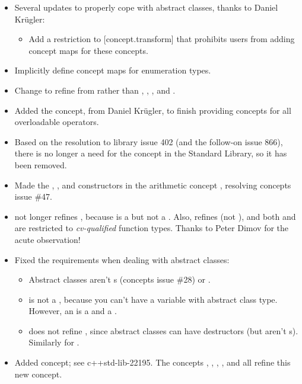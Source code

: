 \documentclass[american,twoside]{book}
\begin{document}
\begin{titlepage}
\begin{itemize}
\item Several updates to properly cope with abstract classes, thanks
  to Daniel Kr\"ugler:
  \begin{itemize}
  \item Add a restriction to [concept.transform] that prohibits users
    from adding concept maps for these concepts.
  \end{itemize}
  \item Implicitly define  concept
    maps for enumeration types.
  \item Change  to refine from
     rather than ,
    , , and
    . 
  \item Added the  
    concept, from Daniel Kr\"ugler, to finish providing concepts for
    all overloadable operators.
  \item Based on the resolution to library issue 402 (and the
    follow-on issue 866), there is no longer a need for the
     concept in the Standard Library, so it has
    been removed.
  \item Made the , , and
     constructors in the arithmetic concept
    , resolving concepts issue \#47.
  \item {} not longer refines
    , because  is a
     but not a . Also,
     refines  (not
    ), and both  and
     are restricted to \emph{cv-qualified}
    function types. Thanks to
    Peter Dimov for the acute observation!
  \item Fixed the requirements when dealing with abstract classes:
    \begin{itemize}
    \item Abstract classes aren't s (concepts
      issue \#28) or .
    \item {} is not a , because
      you can't have a variable with abstract class type. However, an
       is a  and a
      . 
    \item {} does not refine ,
      since abstract classes can have destructors (but aren't
      s). Similarly for
      .
    \end{itemize}
  \item Added  concept; see c++std-lib-22195. The
    concepts , ,
    , , and
     all refine this new concept.
  \end{itemize}

\end{titlepage}
\end{document}
